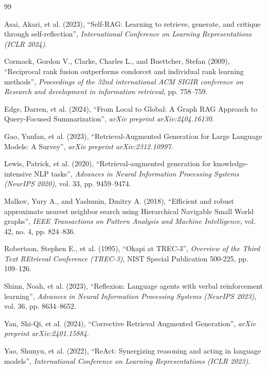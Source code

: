\cleardoublepage
{}
{}

\begin{thebibliography}{99}
\setlength{\itemsep}{0pt plus 0.5pt minus 0.5pt}
\setlength{\parsep}{0pt plus 0.5pt minus 0.5pt}
\setlength{\parskip}{0pt plus 0.5pt minus 0.5pt}

 Asai, Akari, et al. (2023), ``Self-RAG: Learning to retrieve, generate, and critique through self-reflection'', \textit{International Conference on Learning Representations (ICLR 2024)}.

 Cormack, Gordon V., Clarke, Charles L., and Buettcher, Stefan (2009), ``Reciprocal rank fusion outperforms condorcet and individual rank learning methods'', \textit{Proceedings of the 32nd international ACM SIGIR conference on Research and development in information retrieval}, pp. 758--759.

 Edge, Darren, et al. (2024), ``From Local to Global: A Graph RAG Approach to Query-Focused Summarization'', \textit{arXiv preprint arXiv:2404.16130}.

 Gao, Yunfan, et al. (2023), ``Retrieval-Augmented Generation for Large Language Models: A Survey'', \textit{arXiv preprint arXiv:2312.10997}.

 Lewis, Patrick, et al. (2020), ``Retrieval-augmented generation for knowledge-intensive NLP tasks'', \textit{Advances in Neural Information Processing Systems (NeurIPS 2020)}, vol. 33, pp. 9459--9474.

 Malkov, Yury A., and Yashunin, Dmitry A. (2018), ``Efficient and robust approximate nearest neighbor search using Hierarchical Navigable Small World graphs'', \textit{IEEE Transactions on Pattern Analysis and Machine Intelligence}, vol. 42, no. 4, pp. 824--836.

 Robertson, Stephen E., et al. (1995), ``Okapi at TREC-3'', \textit{Overview of the Third Text REtrieval Conference (TREC-3)}, NIST Special Publication 500-225, pp. 109--126.

 Shinn, Noah, et al. (2023), ``Reflexion: Language agents with verbal reinforcement learning'', \textit{Advances in Neural Information Processing Systems (NeurIPS 2023)}, vol. 36, pp. 8634--8652.

 Yan, Shi-Qi, et al. (2024), ``Corrective Retrieval Augmented Generation'', \textit{arXiv preprint arXiv:2401.15884}.

 Yao, Shunyu, et al. (2022), ``ReAct: Synergizing reasoning and acting in language models'', \textit{International Conference on Learning Representations (ICLR 2023)}.

\end{thebibliography}
